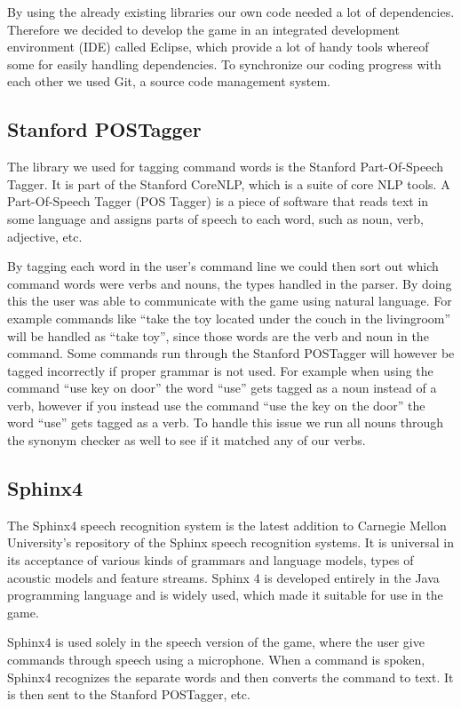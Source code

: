By using the already existing libraries our own code needed a lot of dependencies. Therefore we decided to develop the game in an integrated development environment (IDE) called Eclipse, which provide a lot of handy tools whereof some for easily handling dependencies. To synchronize our coding progress with each other we used Git, a source code management system.

\subsection{Stanford POSTagger}
The library we used for tagging command words is the Stanford Part-Of-Speech Tagger. It is part of the Stanford CoreNLP, which is a suite of core NLP tools. A Part-Of-Speech Tagger (POS Tagger) is a piece of software that reads text in some language and assigns parts of speech to each word, such as noun, verb, adjective, etc. \citep{POSTagger}

By tagging each word in the user's command line we could then sort out which command words were verbs and nouns, the types handled in the parser. By doing this the user was able to communicate with the game using natural language. For example commands like ``take the toy located under the couch in the livingroom'' will be handled as ``take toy'', since those words are the verb and noun in the command. Some commands run through the Stanford POSTagger will however be tagged incorrectly if proper grammar is not used. For example when using the command ``use key on door'' the word ``use'' gets tagged as a noun instead of a verb, however if you instead use the command ``use the key on the door'' the word ``use'' gets tagged as a verb. To handle this issue we run all nouns through the synonym checker as well to see if it matched any of our verbs.

\subsection{Sphinx4}
The Sphinx4 speech recognition system is the latest addition to Carnegie Mellon University's repository of the Sphinx speech recognition systems. It is universal in its acceptance of various kinds of grammars and language models, types of acoustic models and feature streams. Sphinx 4 is developed entirely in the Java programming language and is widely used, which made it suitable for use in the game. \citep{Sphinx4}

Sphinx4 is used solely in the speech version of the game, where the user give commands through speech using a microphone. When a command is spoken, Sphinx4 recognizes the separate words and then converts the command to text. It is then sent to the Stanford POSTagger, etc.

